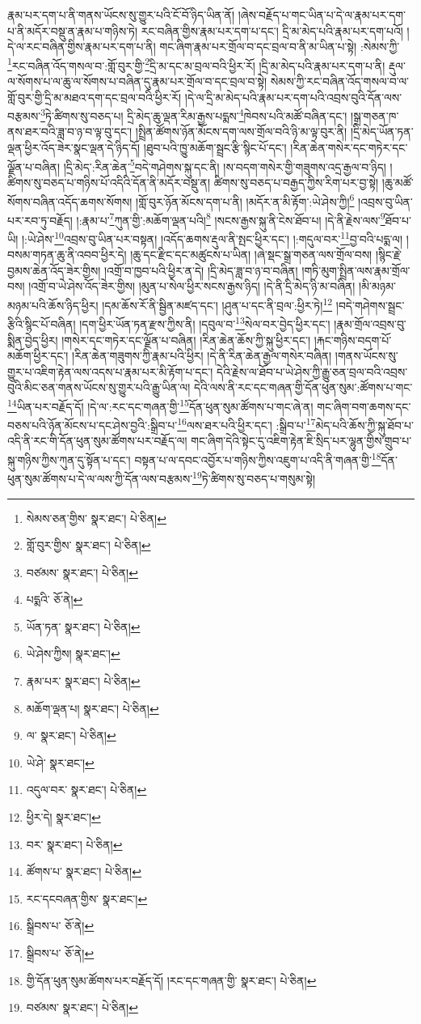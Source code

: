 རྣམ་པར་དག་པ་ནི་གནས་ཡོངས་སུ་གྱུར་པའི་ངོ་བོ་ཉིད་ཡིན་ནོ། །ཞེས་བརྗོད་པ་གང་ཡིན་པ་དེ་ལ་རྣམ་པར་དག་པ་ནི་མདོར་བསྡུ་ན་རྣམ་པ་གཉིས་ཏེ། རང་བཞིན་གྱིས་རྣམ་པར་དག་པ་དང་། དྲི་མ་མེད་པའི་རྣམ་པར་དག་པའོ། །དེ་ལ་རང་བཞིན་གྱིས་རྣམ་པར་དག་པ་ནི། གང་ཞིག་རྣམ་པར་གྲོལ་བ་དང་བྲལ་བ་ནི་མ་ཡིན་པ་སྟེ། :སེམས་ཀྱི་\footnote{སེམས་ཅན་གྱིས་  སྣར་ཐང་།  པེ་ཅིན། }རང་བཞིན་འོད་གསལ་བ་:གློ་བུར་གྱི་\footnote{གློ་བུར་གྱིས་  སྣར་ཐང་།  པེ་ཅིན། }དྲི་མ་དང་མ་བྲལ་བའི་ཕྱིར་རོ། །དྲི་མ་མེད་པའི་རྣམ་པར་དག་པ་ནི། རྡུལ་ལ་སོགས་པ་ལ་ཆུ་ལ་སོགས་པ་བཞིན་དུ་རྣམ་པར་གྲོལ་བ་དང་བྲལ་བ་སྟེ། སེམས་ཀྱི་རང་བཞིན་འོད་གསལ་བ་ལ་གློ་བུར་གྱི་དྲི་མ་མཐའ་དག་དང་བྲལ་བའི་ཕྱིར་རོ། །དེ་ལ་དྲི་མ་མེད་པའི་རྣམ་པར་དག་པའི་འབྲས་བུའི་དོན་ལས་བརྩམས་\footnote{བཙམས་  སྣར་ཐང་།  པེ་ཅིན། }ཏེ་ཚིགས་སུ་བཅད་པ། དྲི་མེད་ཆུ་ལྡན་རིམ་རྒྱས་པདྨས་\footnote{པདྨའི་  ཅོ་ནེ། }ཁེབས་པའི་མཚོ་བཞིན་དང་། །སྒྲ་གཅན་ཁ་ནས་ཐར་བའི་ཟླ་བ་ཉ་བ་ལྟ་བུ་དང་། །སྤྲིན་ཚོགས་ཉོན་མོངས་དག་ལས་གྲོལ་བའི་ཉི་མ་ལྟ་བུར་ནི། །དྲི་མེད་ཡོན་ཏན་ལྡན་ཕྱིར་འོད་ཟེར་སྣང་ལྡན་དེ་ཉིད་དོ། །ཐུབ་པའི་ཁྱུ་མཆོག་སྦྲང་རྩི་སྙིང་པོ་དང་། །རིན་ཆེན་གསེར་དང་གཏེར་དང་ལྗོན་པ་བཞིན། །དྲི་མེད་:རིན་ཆེན་\footnote{ཡོན་ཏན་  སྣར་ཐང་།  པེ་ཅིན། }བདེ་གཤེགས་སྐུ་དང་ནི། །ས་བདག་གསེར་གྱི་གཟུགས་འདྲ་རྒྱལ་བ་ཉིད། །ཚིགས་སུ་བཅད་པ་གཉིས་པོ་འདིའི་དོན་ནི་མདོར་བསྡུ་ན། ཚིགས་སུ་བཅད་པ་བརྒྱད་ཀྱིས་རིག་པར་བྱ་སྟེ། །ཆུ་མཚོ་སོགས་བཞིན་འདོད་ཆགས་སོགས། །གློ་བུར་ཉོན་མོངས་དག་པ་ནི། །མདོར་ན་མི་རྟོག་:ཡེ་ཤེས་ཀྱི།\footnote{ཡེ་ཤེས་ཀྱིས།  སྣར་ཐང་། } །འབྲས་བུ་ཡིན་པར་རབ་ཏུ་བརྗོད། །:རྣམ་པ་\footnote{རྣམ་པར་  སྣར་ཐང་།  པེ་ཅིན། }ཀུན་གྱི་:མཆོག་ལྡན་པའི།\footnote{མཆོག་ལྡན་པ།  སྣར་ཐང་།  པེ་ཅིན། } །སངས་རྒྱས་སྐུ་ནི་ངེས་ཐོབ་པ། །དེ་ནི་རྗེས་ལས་\footnote{ལ་  སྣར་ཐང་།  པེ་ཅིན། }ཐོབ་པ་ཡི། །:ཡེ་ཤེས་\footnote{ཡེ་ཤེ་  སྣར་ཐང་། }འབྲས་བུ་ཡིན་པར་བསྟན། །འདོད་ཆགས་རྡུལ་ནི་སྤང་ཕྱིར་དང་། །:གདུལ་བར་\footnote{འདུལ་བར་  སྣར་ཐང་།  པེ་ཅིན། }བྱ་བའི་པདྨ་ལ། །བསམ་གཏན་ཆུ་ནི་འབབ་ཕྱིར་དེ། །ཆུ་དང་རྫིང་དང་མཚུངས་པ་ཡིན། །ཞེ་སྡང་སྒྲ་གཅན་ལས་གྲོལ་བས། །སྙིང་རྗེ་བྱམས་ཆེན་འོད་ཟེར་གྱིས། །འགྲོ་བ་ཁྱབ་པའི་ཕྱིར་ན་དེ། །དྲི་མེད་ཟླ་བ་ཉ་བ་བཞིན། །གཏི་མུག་སྤྲིན་ལས་རྣམ་གྲོལ་བས། །འགྲོ་བ་ཡེ་ཤེས་འོད་ཟེར་གྱིས། །མུན་པ་སེལ་ཕྱིར་སངས་རྒྱས་ཉིད། །དེ་ནི་དྲི་མེད་ཉི་མ་བཞིན། །མི་མཉམ་མཉམ་པའི་ཆོས་ཉིད་ཕྱིར། །དམ་ཆོས་རོ་ནི་སྦྱིན་མཛད་དང་། །ཤུན་པ་དང་ནི་བྲལ་:ཕྱིར་ཏེ།\footnote{ཕྱིར་དེ།  སྣར་ཐང་། } །བདེ་གཤེགས་སྦྲང་རྩིའི་སྙིང་པོ་བཞིན། །དག་ཕྱིར་ཡོན་ཏན་རྫས་ཀྱིས་ནི། །དབུལ་བ་\footnote{བར་  སྣར་ཐང་།  པེ་ཅིན། }སེལ་བར་བྱེད་ཕྱིར་དང་། །རྣམ་གྲོལ་འབྲས་བུ་སྨིན་བྱེད་ཕྱིར། །གསེར་དང་གཏེར་དང་ལྗོན་པ་བཞིན། །རིན་ཆེན་ཆོས་ཀྱི་སྐུ་ཕྱིར་དང་། །རྐང་གཉིས་བདག་པོ་མཆོག་ཕྱིར་དང་། །རིན་ཆེན་གཟུགས་ཀྱི་རྣམ་པའི་ཕྱིར། །དེ་ནི་རིན་ཆེན་རྒྱལ་གསེར་བཞིན། །གནས་ཡོངས་སུ་གྱུར་པ་འཇིག་རྟེན་ལས་འདས་པ་རྣམ་པར་མི་རྟོག་པ་དང་། དེའི་རྗེས་ལ་ཐོབ་པ་ཡེ་ཤེས་ཀྱི་རྒྱུ་ཅན་བྲལ་བའི་འབྲས་བུའི་མིང་ཅན་གནས་ཡོངས་སུ་གྱུར་པའི་རྒྱུ་ཡིན་ལ། དེའི་ལས་ནི་རང་དང་གཞན་གྱི་དོན་ཕུན་སུམ་:ཚོགས་པ་གང་\footnote{ཚོགས་པ་  སྣར་ཐང་།  པེ་ཅིན། }ཡིན་པར་བརྗོད་དོ། །དེ་ལ་:རང་དང་གཞན་གྱི་\footnote{རང་དངབཞན་གྱིས་  སྣར་ཐང་། }དོན་ཕུན་སུམ་ཚོགས་པ་གང་ཞེ་ན། གང་ཞིག་བག་ཆགས་དང་བཅས་པའི་ཉོན་མོངས་པ་དང་ཤེས་བྱའི་:སྒྲིབ་པ་\footnote{སྒྲིབས་པ་  ཅོ་ནེ། }ལས་ཐར་པའི་ཕྱིར་དང་། :སྒྲིབ་པ་\footnote{སྒྲིབས་པ་  ཅོ་ནེ། }མེད་པའི་ཆོས་ཀྱི་སྐུ་ཐོབ་པ་འདི་ནི་རང་གི་དོན་ཕུན་སུམ་ཚོགས་པར་བརྗོད་ལ། གང་ཞིག་དེའི་སྟེང་དུ་འཇིག་རྟེན་ཇི་སྲིད་པར་ལྷུན་གྱིས་གྲུབ་པ་སྐུ་གཉིས་ཀྱིས་ཀུན་དུ་སྟོན་པ་དང་། བསྟན་པ་ལ་དབང་འབྱོར་པ་གཉིས་ཀྱིས་འཇུག་པ་འདི་ནི་གཞན་གྱི་\footnote{གྱི་དོན་ཕུན་སུམ་ཚོགས་པར་བརྗོད་དོ། །རང་དང་གཞན་གྱི་  སྣར་ཐང་།  པེ་ཅིན། }དོན་ཕུན་སུམ་ཚོགས་པ་དེ་ལ་ལས་ཀྱི་དོན་ལས་བརྩམས་\footnote{བཙམས་  སྣར་ཐང་།  པེ་ཅིན། }ཏེ་ཚིགས་སུ་བཅད་པ་གསུམ་སྟེ། 